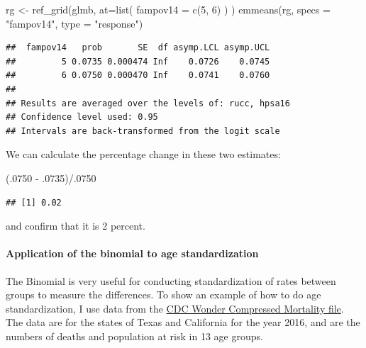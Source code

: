 \documentclass[
]{article}
\newenvironment{Shaded}{\begin{snugshade}}{\end{snugshade}}
\newcommand{\AttributeTok}[1]{\textcolor[rgb]{0.77,0.63,0.00}{#1}}
\newcommand{\DecValTok}[1]{\textcolor[rgb]{0.00,0.00,0.81}{#1}}
\newcommand{\FunctionTok}[1]{\textcolor[rgb]{0.00,0.00,0.00}{#1}}
\newcommand{\NormalTok}[1]{#1}
\newcommand{\OtherTok}[1]{\textcolor[rgb]{0.56,0.35,0.01}{#1}}
\newcommand{\SpecialCharTok}[1]{\textcolor[rgb]{0.00,0.00,0.00}{#1}}
\newcommand{\StringTok}[1]{\textcolor[rgb]{0.31,0.60,0.02}{#1}}
\begin{document}
\begin{Shaded}
\begin{Highlighting}[]
\NormalTok{rg }\OtherTok{\textless{}{-}} \FunctionTok{ref\_grid}\NormalTok{(glmb,}
               \AttributeTok{at=}\FunctionTok{list}\NormalTok{( }\AttributeTok{fampov14 =} \FunctionTok{c}\NormalTok{(}\DecValTok{5}\NormalTok{, }\DecValTok{6}\NormalTok{) ) ) }
\FunctionTok{emmeans}\NormalTok{(rg,}
        \AttributeTok{specs =} \StringTok{"fampov14"}\NormalTok{,}
        \AttributeTok{type =} \StringTok{"response"}\NormalTok{)}
\end{Highlighting}
\end{Shaded}

\begin{verbatim}
##  fampov14   prob       SE  df asymp.LCL asymp.UCL
##         5 0.0735 0.000474 Inf    0.0726    0.0745
##         6 0.0750 0.000470 Inf    0.0741    0.0760
## 
## Results are averaged over the levels of: rucc, hpsa16 
## Confidence level used: 0.95 
## Intervals are back-transformed from the logit scale
\end{verbatim}

We can calculate the percentage change in these two estimates:

\begin{Shaded}
\begin{Highlighting}[]
\NormalTok{(.}\DecValTok{0750} \SpecialCharTok{{-}}\NormalTok{ .}\DecValTok{0735}\NormalTok{)}\SpecialCharTok{/}\NormalTok{.}\DecValTok{0750}
\end{Highlighting}
\end{Shaded}

\begin{verbatim}
## [1] 0.02
\end{verbatim}

and confirm that it is 2 percent.

\hypertarget{application-of-the-binomial-to-age-standardization}{%
\paragraph{Application of the binomial to age standardization}\label{application-of-the-binomial-to-age-standardization}}

The Binomial is very useful for conducting standardization of rates between groups to measure the differences. To show an example of how to do age standardization, I use data from the \href{https://wonder.cdc.gov/mortSQL.html}{CDC Wonder Compressed Mortality file}. The data are for the states of Texas and California for the year 2016, and are the numbers of deaths and population at risk in 13 age groups.
\end{document}
